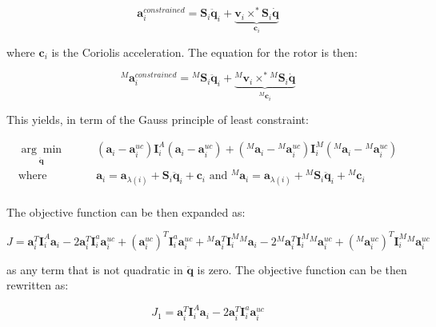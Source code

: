 \begin{equation}
    \mathbf{a} ^{constrained} _i = \mathbf{S} _i \ddot{\mathbf{q}} _i + \underbrace{\mathbf{v} _i \times ^* \mathbf{S} _i \dot{\mathbf{q}}} _{\mathbf{c} _i}
\end{equation}

where $\mathbf{c} _i$ is the Coriolis acceleration. The equation for the rotor is then:

\begin{equation}
    {} ^M \mathbf{a} ^{constrained} _i = {} ^M \mathbf{S} _i \ddot{\mathbf{q}} _i + \underbrace{{} ^M \mathbf{v} _i \times ^* {} ^M\mathbf{S} _i \dot{\mathbf{q}}} _{{} ^M \mathbf{c} _i}
\end{equation}

This yields, in term of the Gauss principle of least constraint:

\begin{align}
    \underset{\ddot{\mathbf{q}}}{\arg \min} & \qquad (\mathbf{a} _i - \mathbf{a} _i ^{uc}) \mathbf{I} ^A _i (\mathbf{a} _i - \mathbf{a} _i ^{uc}) + ({} ^M \mathbf{a} _i - {} ^M \mathbf{a} _i ^{uc}) \mathbf{I} ^M _i ({} ^M \mathbf{a} _i - {} ^M \mathbf{a} _i ^{uc}) \nonumber           \\
    \text{where }                           & \qquad \mathbf{a} _i = \mathbf{a} _{\lambda (i)} + \mathbf{S} _i \ddot{\mathbf{q}} _i + \mathbf{c} _i \text{ and } {} ^M \mathbf{a} _i = \mathbf{a} _{\lambda (i)} + {} ^M  \mathbf{S} _i \ddot{\mathbf{q}} _i + {} ^M \mathbf{c} _i \nonumber \\
\end{align}

The objective function can be then expanded as:

\begin{equation}
    J = \mathbf{a} ^T _i \mathbf{I} ^A _i \mathbf{a} _i - 2\mathbf{a} ^T _i \mathbf{I} ^a _i \mathbf{a} ^{uc} _i + (\mathbf{a} ^{uc} _i) ^T \mathbf{I} ^a _i \mathbf{a} ^{uc} _i + {} ^M \mathbf{a} ^T _i \mathbf{I} ^M _i {} ^M \mathbf{a} _i - 2 {} ^M \mathbf{a} ^T _i \mathbf{I} ^M _i {} ^M \mathbf{a} ^{uc} _i + ({} ^M \mathbf{a} ^{uc} _i) ^T \mathbf{I} ^M _i {} ^M \mathbf{a} ^{uc} _i
\end{equation}

as any term that is not quadratic in $\ddot{\mathbf{q}}$ is zero. The objective function can be then rewritten as:

\begin{equation}
    J _1 = \mathbf{a} ^T _i \mathbf{I} ^A _i \mathbf{a} _i - 2\mathbf{a} ^T _i \mathbf{I} ^a _i \mathbf{a} ^{uc} _i
\end{equation}

